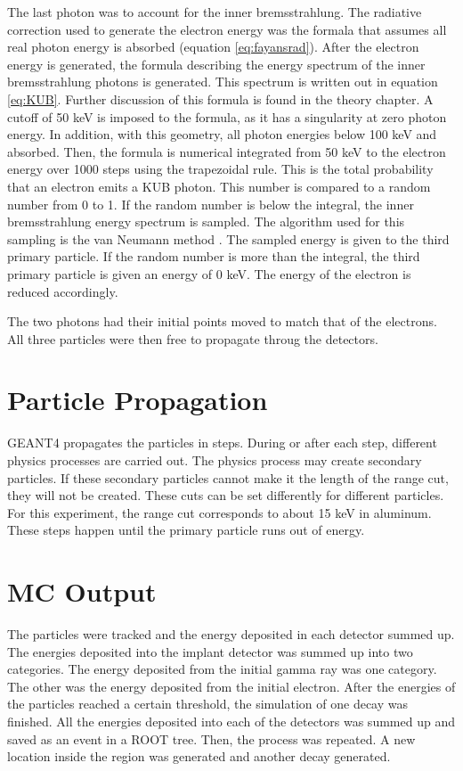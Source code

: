 The last photon was to account for the inner bremsstrahlung.
The radiative correction used to generate the electron energy was the formala that assumes all real photon energy is absorbed (equation \ref{eq:fayansrad}).
After the electron energy is generated, the formula describing the energy spectrum of the inner bremsstrahlung photons is generated. 
This spectrum is written out in equation \ref{eq:KUB}. %
Further discussion of this formula is found in the theory chapter.
A cutoff of 50 keV is imposed to the formula, as it has a singularity at zero photon energy.
In addition, with this geometry, all photon energies below 100 keV and absorbed.
Then, the formula is numerical integrated from 50 keV to the electron energy over 1000 steps using the trapezoidal rule.
This is the total probability that an electron emits a KUB photon.
This number is compared to a random number from 0 to 1.
If the random number is below the integral, the inner bremsstrahlung energy spectrum is sampled.
The algorithm used for this sampling is the van Neumann method \cite{neu51}.
The sampled energy is given to the third primary particle.
If the random number is more than the integral, the third primary particle is given an energy of 0 keV.
The energy of the electron is reduced accordingly.

The two photons had their initial points moved to match that of the electrons.
All three particles were then free to propagate throug the detectors.

\section{Particle Propagation}  
GEANT4 propagates the particles in steps.
During or after each step, different physics processes are carried out.
The physics process may create secondary particles.
If these secondary particles cannot make it the length of the range cut, they will not be created.
These cuts can be set differently for different particles.
For this experiment, the range cut corresponds to about 15 keV in aluminum.
These steps happen until the primary particle runs out of energy.

\section{MC Output}
The particles were tracked and the energy deposited in each detector summed up.
The energies deposited into the implant detector was summed up into two categories.
The energy deposited from the initial gamma ray was one category.
The other was the energy deposited from the initial electron.
After the energies of the particles reached a certain threshold, the simulation of one decay was finished.
All the energies deposited into each of the detectors was summed up and saved as an event in a ROOT tree.
Then, the process was repeated.
A new location inside the region was generated and another decay generated.

